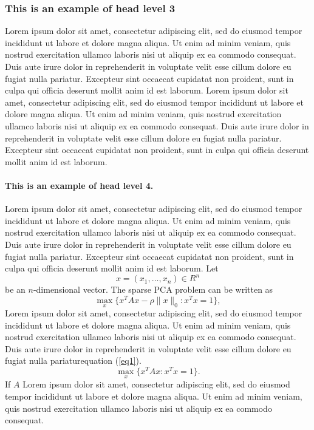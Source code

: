 \documentclass[english]{sbcreviews-2025}%
\begin{document}
\subsubsection{This is an example of head level 3}
Lorem ipsum dolor sit amet, consectetur adipiscing elit, sed do eiusmod tempor incididunt ut labore et dolore magna aliqua. Ut enim ad minim veniam, quis nostrud exercitation ullamco laboris nisi ut aliquip ex ea commodo consequat. Duis aute irure dolor in reprehenderit in voluptate velit esse cillum dolore eu fugiat nulla pariatur. Excepteur sint occaecat cupidatat non proident, sunt in culpa qui officia deserunt mollit anim id est laborum. Lorem ipsum dolor sit amet, consectetur adipiscing elit, sed do eiusmod tempor incididunt ut labore et dolore magna aliqua. Ut enim ad minim veniam, quis nostrud exercitation ullamco laboris nisi ut aliquip ex ea commodo consequat. Duis aute irure dolor in reprehenderit in voluptate velit esse cillum dolore eu fugiat nulla pariatur. Excepteur sint occaecat cupidatat non proident, sunt in culpa qui officia deserunt mollit anim id est laborum.

\paragraph{This is an example of head level 4.}
Lorem ipsum dolor sit amet, consectetur adipiscing elit, sed do eiusmod tempor incididunt ut labore et dolore magna aliqua. Ut enim ad minim veniam, quis nostrud exercitation ullamco laboris nisi ut aliquip ex ea commodo consequat. Duis aute irure dolor in reprehenderit in voluptate velit esse cillum dolore eu fugiat nulla pariatur. Excepteur sint occaecat cupidatat non proident, sunt in culpa qui officia deserunt mollit anim id est laborum. 
Let
\[
x=(x_1,\dots,x_n)\in R^n
\]be an \(n\)-dimensional vector. The sparse PCA problem can be written as
\begin{equation}\label{eq1}
\max\limits_{x}\{x^TAx-\rho\|x\|_0:x^Tx=1\},
\end{equation}
Lorem ipsum dolor sit amet, consectetur adipiscing elit, sed do eiusmod tempor incididunt ut labore et dolore magna aliqua. Ut enim ad minim veniam, quis nostrud exercitation ullamco laboris nisi ut aliquip ex ea commodo consequat. Duis aute irure dolor in reprehenderit in voluptate velit esse cillum dolore eu fugiat nulla pariatur\break equation (\ref{eq1}). 
\[\max\limits_{x}\{x^TAx :x^Tx=1\}.\]
If $A$ Lorem ipsum dolor sit amet, consectetur adipiscing elit, sed do eiusmod tempor incididunt ut labore et dolore magna aliqua. Ut enim ad minim veniam, quis nostrud exercitation ullamco laboris nisi ut aliquip ex ea commodo consequat. 
\end{document}
